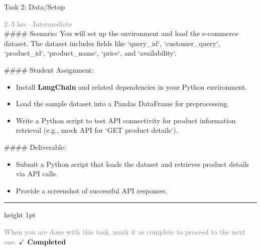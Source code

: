 \documentclass[10pt,a4paper]{article}
\begin{document}
\begin{taskbox}{Task 2: Data/Setup}

    {\small \textcolor{gray}{2--3 hrs $\cdot$ Intermediate}}\\[12pt]

    \#\#\#\# Scenario:
You will set up the environment and load the e-commerce dataset. The dataset includes fields like `query\_id`, `customer\_query`, `product\_id`, `product\_name`, `price`, and `availability`.

\#\#\#\# Student Assignment:
\begin{itemize}
    \item Install \textbf{LangChain} and related dependencies in your Python environment.
    \item Load the sample dataset into a Pandas DataFrame for preprocessing.
    \item Write a Python script to test API connectivity for product information retrieval (e.g., mock API for `GET product details`).
\end{itemize}

\#\#\#\# Deliverable:
\begin{itemize}
    \item Submit a Python script that loads the dataset and retrieves product details via API calls.
    \item Provide a screenshot of successful API responses.\par
\end{itemize}

    \vspace{16pt}

    \textcolor{cardBorder}{\hrule height 1pt}\vspace{8pt}

    \small \textcolor{gray}{When you are done with this task, mark it as complete to proceed to the next one.} \hfill \textbf{\textcolor{brandDark}{$\checkmark$ Completed}}

\end{taskbox}
\end{document}
